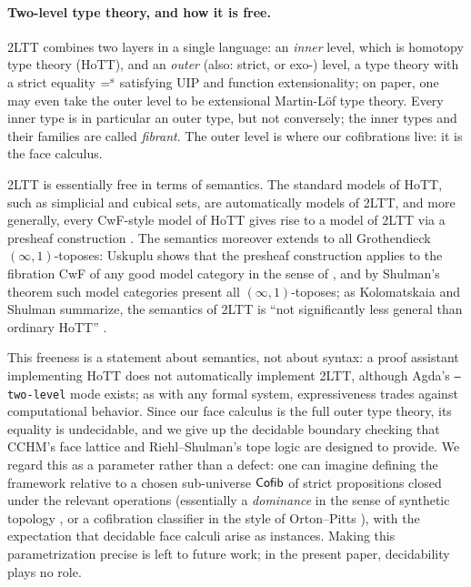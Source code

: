 \paragraph{Two-level type theory, and how it is free.}
2LTT combines two layers in a
single language: an \emph{inner} level, which is homotopy type theory (HoTT),
and an \emph{outer} (also: strict, or exo-) level, a type theory with a strict
equality $\mathrel{=^\textup{s}}$ satisfying UIP and function extensionality; on paper, one
may even take the outer level to be extensional Martin-L\"of type theory.
Every inner type is in particular an outer type, but not conversely; the
inner types and their families are called \emph{fibrant}. The outer level is
where our cofibrations live: it is the face calculus.

2LTT is essentially free in terms of semantics. The standard models of HoTT,
such as simplicial and cubical sets, are automatically models of 2LTT, and
more generally, every CwF-style model of HoTT gives rise to a model of 2LTT
via a presheaf construction \citep{2LTT,Capriotti2017}. The semantics moreover
extends to all Grothendieck $(\infty,1)$-toposes: Uskuplu \citep[\S4--\S5]{Uskuplu2025} shows that the
presheaf construction applies to the fibration CwF of any good model category
in the sense of \citet{LumsdaineShulman2020}, and by Shulman's theorem
\citep{Shulman2019Toposes} such model categories present all
$(\infty,1)$-toposes; as Kolomatskaia and Shulman summarize, the semantics of
2LTT is \enquote{not significantly less general than ordinary HoTT}
\citep{KolomatskaiaShulman2025}.

This freeness is a statement about semantics, not about syntax: a proof
assistant implementing HoTT does not automatically implement 2LTT, although
Agda's \texttt{--two-level} mode \citep{agdareadthedocs} exists; as with
any formal system, expressiveness trades against computational behavior.
Since our face calculus is the full outer type theory, its equality is
undecidable, and we give up the decidable boundary checking that CCHM's face
lattice and Riehl--Shulman's tope logic are designed to provide. We regard
this as a parameter rather than a defect: one can imagine defining the
framework relative to a chosen sub-universe $\mathsf{Cofib}$ of strict propositions
closed under the relevant operations (essentially a \emph{dominance} in the
sense of synthetic topology \citep{Rosolini1986,Escardo2004}, or a cofibration
classifier in the style of
Orton--Pitts \citep{OrtonPitts2018}), with the expectation that decidable
face calculi arise as instances. Making this parametrization precise is left
to future work; in the present paper, decidability plays no role.

